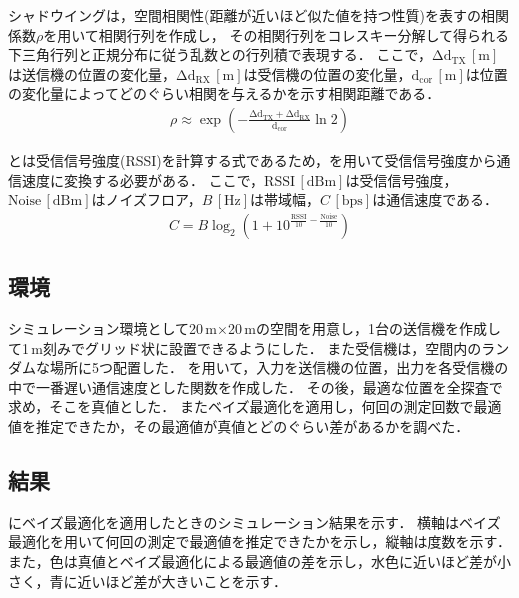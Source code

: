 \documentclass[twocolumn]{ltjarticle}
\begin{document}
シャドウイングは，空間相関性(距離が近いほど似た値を持つ性質)を表すの相関係数\(\rho\)を用いて相関行列を作成し，
その相関行列をコレスキー分解して得られる下三角行列と正規分布に従う乱数との行列積で表現する\cite{shadowing}．
ここで，\(\mathrm{\Delta d_{TX}}\,\mathrm{[m]}\)は送信機の位置の変化量，\(\mathrm{\Delta d_{RX}}\,\mathrm{[m]}\)は受信機の位置の変化量，\(\mathrm{d_{cor}}\,\mathrm{[m]}\)は位置の変化量によってどのぐらい相関を与えるかを示す相関距離である．
\begin{align}
	\rho \approx \exp \left( - \mathrm{\frac{\Delta d_{TX} + \Delta d_{RX}}{d_{cor}}} \ln 2 \right) \label{eq:shadowing}
\end{align}

とは受信信号強度(RSSI)を計算する式であるため，を用いて受信信号強度から通信速度に変換する必要がある．
ここで，\(\mathrm{RSSI}\,[\mathrm{dBm}]\)は受信信号強度，\(\mathrm{Noise}\,[\mathrm{dBm}]\)はノイズフロア，\(B\,[\mathrm{Hz}]\)は帯域幅，\(C\,[\mathrm{bps}]\)は通信速度である．
\begin{align}
	C = B \log_2 \left( 1 + 10^{\frac{\mathrm{RSSI}}{10}-\frac{\mathrm{Noise}}{10}} \right) \label{eq:capacity}
\end{align}
\subsection{環境}

シミュレーション環境として20\(\,\)m\(\times\)20\(\,\)mの空間を用意し，1台の送信機を作成して1\(\,\)m刻みでグリッド状に設置できるようにした．
また受信機は，空間内のランダムな場所に5つ配置した．
を用いて，入力を送信機の位置，出力を各受信機の中で一番遅い通信速度とした関数を作成した．
その後，最適な位置を全探査で求め，そこを真値とした．
またベイズ最適化を適用し，何回の測定回数で最適値を推定できたか，その最適値が真値とどのぐらい差があるかを調べた．
\subsection{結果}

にベイズ最適化を適用したときのシミュレーション結果を示す．
横軸はベイズ最適化を用いて何回の測定で最適値を推定できたかを示し，縦軸は度数を示す．
また，色は真値とベイズ最適化による最適値の差を示し，水色に近いほど差が小さく，青に近いほど差が大きいことを示す．
\end{document}
